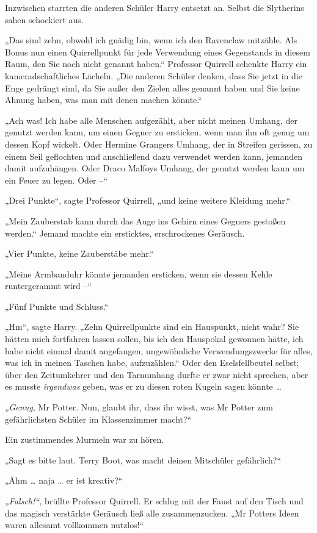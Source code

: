 {Inzwischen starrten die anderen Schüler Harry entsetzt an. Selbst die Slytherins sahen schockiert aus.

„Das sind zehn, obwohl ich gnädig bin, wenn ich den Ravenclaw mitzähle. Als Bonus nun einen Quirrellpunkt für jede Verwendung eines Gegenstands in diesem Raum, den Sie noch nicht genannt haben.“ Professor Quirrell schenkte Harry ein kameradschaftliches Lächeln. „Die anderen Schüler denken, dass Sie jetzt in die Enge gedrängt sind, da Sie außer den Zielen alles genannt haben und Sie keine Ahnung haben, was man mit denen machen könnte.“

„Ach was! Ich habe alle Menschen aufgezählt, aber nicht meinen Umhang, der genutzt werden kann, um einen Gegner zu ersticken, wenn man ihn oft genug um dessen Kopf wickelt. Oder Hermine Grangers Umhang, der in Streifen gerissen, zu einem Seil geflochten und anschließend dazu verwendet werden kann, jemanden damit aufzuhängen. Oder Draco Malfoys Umhang, der genutzt werden kann um ein Feuer zu legen. Oder --“

„Drei Punkte“, sagte Professor Quirrell, „und keine weitere Kleidung mehr.“

„Mein Zauberstab kann durch das Auge ins Gehirn eines Gegners gestoßen werden.“ Jemand machte ein ersticktes, erschrockenes Geräusch.

„Vier Punkte, keine Zauberstäbe mehr.“

„Meine Armbanduhr könnte jemanden ersticken, wenn sie dessen Kehle runtergerammt wird --“

„Fünf Punkte und Schluss.“

„Hm“, sagte Harry. „Zehn Quirrellpunkte sind ein Hauspunkt, nicht wahr? Sie hätten mich fortfahren lassen sollen, bis ich den Hauspokal gewonnen hätte, ich habe nicht einmal damit angefangen, ungewöhnliche Verwendungszwecke für alles, was ich in meinen Taschen habe, aufzuzählen.“ Oder den Eselsfellbeutel selbst; über den Zeitumkehrer und den Tarnumhang durfte er zwar nicht sprechen, aber es musste \emph{irgendwas} geben, was er zu diesen roten Kugeln sagen könnte …

\emph{„Genug,} Mr Potter. Nun, glaubt ihr, dass ihr wisst, was Mr Potter zum gefährlichsten Schüler im Klassenzimmer macht?“

Ein zustimmendes Murmeln war zu hören.

„Sagt es bitte laut. Terry Boot, was macht deinen Mitschüler gefährlich?“

„Ähm … naja … er ist kreativ?“

\emph{„Falsch!“,} brüllte Professor Quirrell. Er schlug mit der Faust auf den Tisch und das magisch verstärkte Geräusch ließ alle zusammenzucken. „Mr Potters Ideen waren allesamt vollkommen nutzlos!“

}
